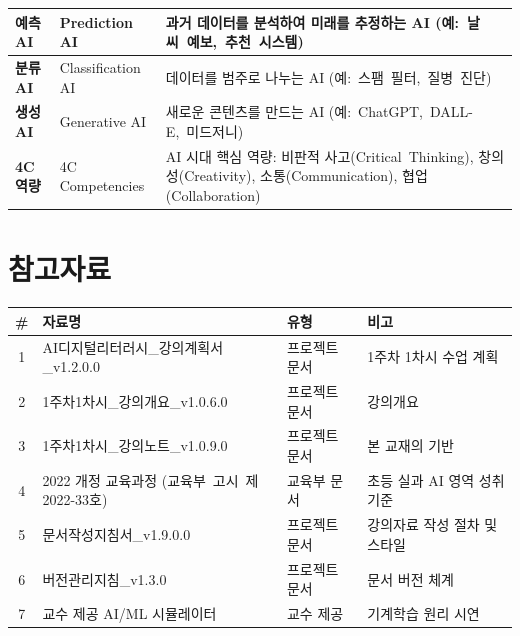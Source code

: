 \documentclass[11pt,a4paper]{article}
\renewcommand{\arraystretch}{1.4}
\begin{document}
\begin{center}
\begin{tabular}{|p{3cm}|p{3.5cm}|p{6.5cm}|}
\hline
\textbf{예측 AI} & Prediction AI & 과거 데이터를 분석하여 미래를 추정하는 AI \mbox{(예: 날씨 예보, 추천 시스템)} \\
\hline
\textbf{분류 AI} & Classification AI & 데이터를 범주로 나누는 AI \mbox{(예: 스팸 필터, 질병 진단)} \\
\hline
\textbf{생성 AI} & Generative AI & 새로운 콘텐츠를 만드는 AI \mbox{(예: ChatGPT, DALL-E, 미드저니)} \\
\hline
\textbf{4C 역량} & 4C Competencies & AI 시대 핵심 역량: 비판적 사고\mbox{(Critical Thinking)}, 창의성\mbox{(Creativity)}, 소통\mbox{(Communication)}, 협업\mbox{(Collaboration)} \\
\hline
\end{tabular}
\end{center}

\newpage


\section*{참고자료}

\begin{center}
\renewcommand{\arraystretch}{1.4}
\begin{tabular}{|c|p{6.5cm}|p{3cm}|p{3cm}|}
\hline
\rowcolor{tableheader}
\textbf{\#} & \textbf{자료명} & \textbf{유형} & \textbf{비고} \\
\hline
1 & AI디지털리터러시\_강의계획서\_v1.2.0.0 & 프로젝트 문서 & 1주차 1차시 수업 계획 \\
\hline
2 & 1주차1차시\_강의개요\_v1.0.6.0 & 프로젝트 문서 & 강의개요 \\
\hline
3 & 1주차1차시\_강의노트\_v1.0.9.0 & 프로젝트 문서 & 본 교재의 기반 \\
\hline
4 & 2022 개정 교육과정 \mbox{(교육부 고시 제2022-33호)} & 교육부 문서 & 초등 실과 AI 영역 성취기준 \\
\hline
5 & 문서작성지침서\_v1.9.0.0 & 프로젝트 문서 & 강의자료 작성 절차 및 스타일 \\
\hline
6 & 버전관리지침\_v1.3.0 & 프로젝트 문서 & 문서 버전 체계 \\
\hline
7 & 교수 제공 AI/ML 시뮬레이터 & 교수 제공 & 기계학습 원리 시연 \\
\hline
\end{tabular}
\end{center}

\end{document}
